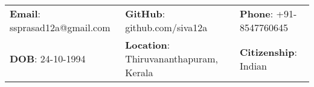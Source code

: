 \documentclass[letterpaper, 11pt]{article}
\begin{document}


\vspace{0.5cm} 
\begin{center}
\begin{tabular}{lll}
\textbf{Email}: ssprasad12a@gmail.com      &
\hspace{0.35in} \textbf{GitHub}: github.com/siva12a    &
\hspace{0.35in} 	\textbf{Phone}: +91-8547760645 \\

\textbf{DOB}: 24-10-1994   & 
\hspace{0.35in} \textbf{Location}: Thiruvananthapuram, Kerala   & 
\hspace{0.35in} \textbf{Citizenship}: Indian 


\end{tabular}
\end{center}


\setlength{\tabcolsep}{8pt}
\end{document}
